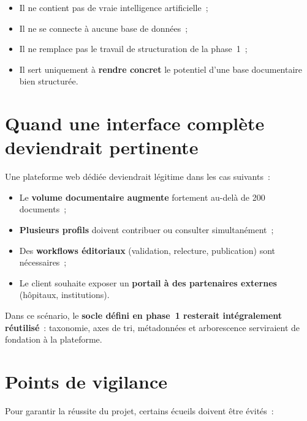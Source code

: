 \documentclass[12pt, a4paper]{article}
\begin{document}
\begin{itemize}[leftmargin=1.5em]
  \item Il ne contient pas de vraie intelligence artificielle~;
  \item Il ne se connecte à aucune base de données~;
  \item Il ne remplace pas le travail de structuration de la phase~1~;
  \item Il sert uniquement à \textbf{rendre concret} le potentiel d'une base documentaire bien structurée.
\end{itemize}

\section{Quand une interface complète deviendrait pertinente}

Une plateforme web dédiée deviendrait légitime dans les cas suivants~:

\begin{itemize}[leftmargin=1.5em]
  \item Le \textbf{volume documentaire augmente} fortement au-delà de 200 documents~;
  \item \textbf{Plusieurs profils} doivent contribuer ou consulter simultanément~;
  \item Des \textbf{workflows éditoriaux} (validation, relecture, publication) sont nécessaires~;
  \item Le client souhaite exposer un \textbf{portail à des partenaires externes} (hôpitaux, institutions).
\end{itemize}

\begin{infobox}
Dans ce scénario, le \textbf{socle défini en phase~1 resterait intégralement réutilisé}~: taxonomie, axes de tri, métadonnées et arborescence serviraient de fondation à la plateforme.
\end{infobox}

\section{Points de vigilance}

Pour garantir la réussite du projet, certains écueils doivent être évités~:
\end{document}

